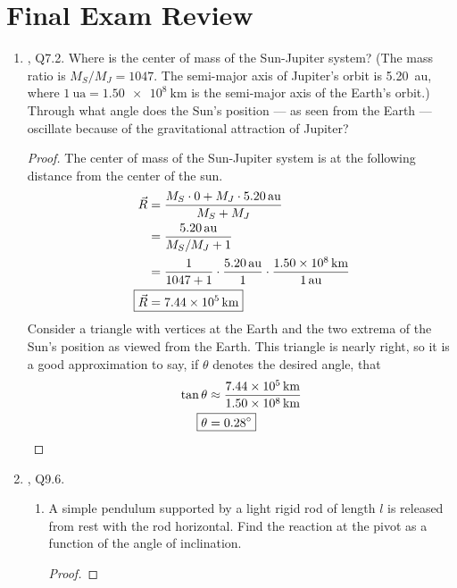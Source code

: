\documentclass[../psets.tex]{subfiles}
\begin{document}
\section{Final Exam Review}
\begin{enumerate}
    \item {}\textcite{bib:KibbleBerkshire}, Q7.2. Where is the center of mass of the Sun-Jupiter system? (The mass ratio is $M_S/M_J=1047$. The semi-major axis of Jupiter's orbit is \SI{5.20}{\astronomicalunit}, where $\SI{1}{\astronomicalunit}=\SI{1.50e8}{\kilo\meter}$ is the semi-major axis of the Earth's orbit.) Through what angle does the Sun's position --- as seen from the Earth --- oscillate because of the gravitational attraction of Jupiter?
    \begin{proof}
        The center of mass of the Sun-Jupiter system is at the following distance from the center of the sun.
        \begin{align*}
            \vec{R} &= \frac{M_S\cdot 0+M_J\cdot\SI{5.20}{\astronomicalunit}}{M_S+M_J}\\
            &= \frac{\SI{5.20}{\astronomicalunit}}{M_S/M_J+1}\\
            &= \frac{1}{1047+1}\cdot\frac{\SI{5.20}{\astronomicalunit}}{1}\cdot\frac{\SI{1.50e8}{\kilo\meter}}{\SI{1}{\astronomicalunit}}\\
            \Aboxed{\vec{R} &= \SI{7.44e5}{\kilo\meter}}
        \end{align*}
        Consider a triangle with vertices at the Earth and the two extrema of the Sun's position as viewed from the Earth. This triangle is nearly right, so it is a good approximation to say, if $\theta$ denotes the desired angle, that
        \begin{align*}
            \tan\theta &\approx \frac{\SI{7.44e5}{\kilo\meter}}{\SI{1.50e8}{\kilo\meter}}\\
            \Aboxed{\theta &= \ang{0.28}}
        \end{align*}
    \end{proof}
    \item \textcite{bib:KibbleBerkshire}, Q9.6.
    \begin{enumerate}
        \item A simple pendulum supported by a light rigid rod of length $l$ is released from rest with the rod horizontal. Find the reaction at the pivot as a function of the angle of inclination.
        \begin{proof}
                

\end{proof}
\end{enumerate}
\end{enumerate}
\end{document}
